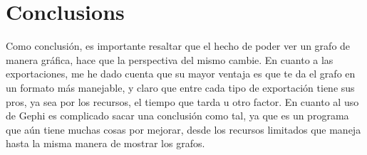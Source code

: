 \documentclass[12pt]{article}
\begin{document}
\section{Conclusions}\label{conclusions}
Como conclusión, es importante resaltar que el hecho de poder ver un grafo de manera gráfica, hace que la perspectiva del mismo cambie.
En cuanto a las exportaciones, me he dado cuenta que su mayor ventaja es que te da el grafo en un formato más manejable, y claro que entre cada tipo de exportación tiene sus pros, ya sea por los recursos, el tiempo que tarda u otro factor.
En cuanto al uso de Gephi es complicado sacar una conclusión como tal, ya que es un programa que aún tiene muchas cosas por mejorar, desde los recursos limitados que maneja hasta la misma manera de mostrar los grafos.



\end{document}
